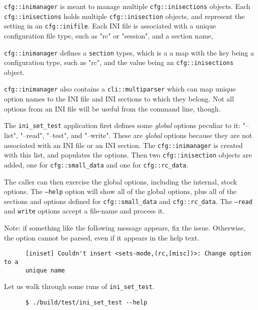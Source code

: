    \texttt{cfg::inimanager} is meant to manage multiple
   \texttt{cfg::inisections} objects.
   Each \texttt{cfg::inisections} holds multiple
   \texttt{cfg::inisection} objects, and represent the
   setting in an \texttt{cfg::inifile}.
   Each INI file is associated with a unique configuration file type,
   such as "rc" or "session", and a section name,

   \texttt{cfg::inimanager} defines a \texttt{section} types, which is a 
   a map with the key being a configuration type, such as "rc", and
   the value being an \texttt{cfg::inisections} object.

   \texttt{cfg::inimanager} also contains a
   \texttt{cli::multiparser} which can map unique option names to
   the INI file and INI sections to which they belong.
   Not all options from an INI file will be useful from the command
   line, though.

   The \texttt{ini\_set\_test} application first defines some
   \textsl{global} options
   peculiar to it: "--list", "--read", "--test", and "--write".
   These are \textsl{global} options because they are not associated with
   an INI file or an INI section.
   The \texttt{cfg::inimanager} is created with this list, and populates
   the options. Then two \texttt{cfg::inisection} objects are
   added, one for \texttt{cfg::small\_data} and
   one for \texttt{cfg::rc\_data}.

   The caller can then exercise the global options, including the internal,
   stock options.  The \texttt{--help} option will show all of the global
   options, plus all of the sections and options defined for
   \texttt{cfg::small\_data} and
   \texttt{cfg::rc\_data}.
   The \texttt{--read} and \texttt{write} options accept a file-name and
   process it.

   Note: if something like the following message appears, fix the issue.
   Otherwise, the option cannot be parsed, even if it appears in the
   help text.

   \begin{verbatim}
      [iniset] Couldn't insert <sets-mode,(rc,[misc])>: Change option to a
      unique name
   \end{verbatim}

   Let us walk through some runs of
   \texttt{ini\_set\_test}.

   \begin{verbatim}
      $ ./build/test/ini_set_test --help
   \end{verbatim}

